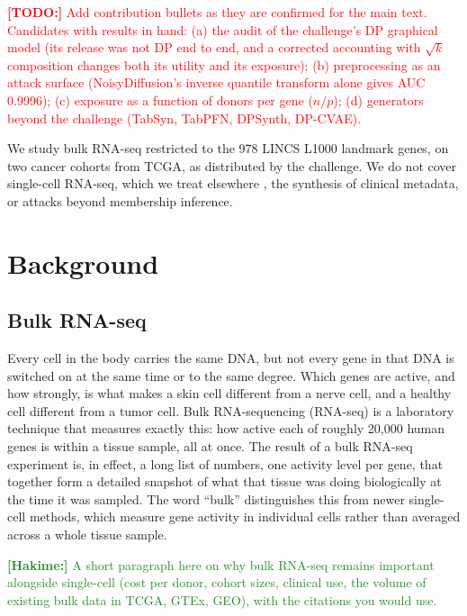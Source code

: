 \documentclass[webpdf,contemporary,large]{oup-authoring-template}
\newif\ifdraft \drafttrue
\newcommand{\annot}[3]{\ifdraft\textcolor{#1}{\textbf{[#2:]} #3}\fi}
\newcommand{\hakime}[1]{\annot{ForestGreen}{Hakime}{#1}}
\newcommand{\todo}[1]{\annot{red}{TODO}{#1}}
\begin{document}
\todo{Add contribution bullets as they are confirmed for the main text. Candidates with results in hand: (a) the audit of the challenge's DP graphical model (its release was not DP end to end, and a corrected accounting with $\sqrt{k}$ composition changes both its utility and its exposure); (b) preprocessing as an attack surface (NoisyDiffusion's inverse quantile transform alone gives AUC 0.9996); (c) exposure as a function of donors per gene ($n/p$); (d) generators beyond the challenge (TabSyn, TabPFN, DPSynth, DP-CVAE).}

We study bulk RNA-seq restricted to the 978 LINCS L1000 landmark genes, on two cancer cohorts from TCGA, as distributed by the challenge. We do not cover single-cell RNA-seq, which we treat elsewhere \citep{golob2026a}, the synthesis of clinical metadata, or attacks beyond membership inference.

\section{Background}
\label{sec:background}

\subsection{Bulk RNA-seq}
\label{sec:bulk}

Every cell in the body carries the same DNA, but not every gene in that DNA is switched on at the same time or to the same degree. Which genes are active, and how strongly, is what makes a skin cell different from a nerve cell, and a healthy cell different from a tumor cell. Bulk RNA-sequencing (RNA-seq) is a laboratory technique that measures exactly this: how active each of roughly 20{,}000 human genes is within a tissue sample, all at once. The result of a bulk RNA-seq experiment is, in effect, a long list of numbers, one activity level per gene, that together form a detailed snapshot of what that tissue was doing biologically at the time it was sampled. The word ``bulk'' distinguishes this from newer single-cell methods, which measure gene activity in individual cells rather than averaged across a whole tissue sample.

\hakime{A short paragraph here on why bulk RNA-seq remains important alongside single-cell (cost per donor, cohort sizes, clinical use, the volume of existing bulk data in TCGA, GTEx, GEO), with the citations you would use.}
\end{document}
